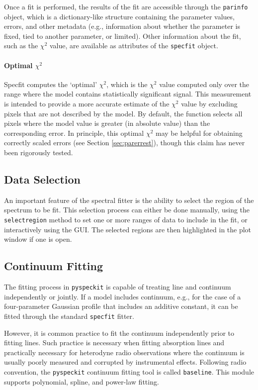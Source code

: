 \documentclass[twocolumn]{aastex62}
\newcommand{\pyspeckit}{\texttt{pyspeckit}\xspace}
\begin{document}
Once a fit is performed, the results of the fit are accessible through the
\texttt{parinfo} object, which is a dictionary-like structure containing
the parameter values, errors, and other metadata (e.g., information about
whether the parameter is fixed, tied to another parameter, or limited).
Other information about the fit, such as the $\chi^2$ value, are available
as attributes of the \texttt{specfit} object.

\paragraph{Optimal $\chi^2$}
Specfit computes the `optimal' $\chi^2$, which is the $\chi^2$
value computed only over the range where the model contains statistically
significant signal.  This measurement is intended to provide a more
accurate estimate of the $\chi^2$ value by excluding pixels that are
not described by the model.  By default, the function selects all pixels where
the model value is greater (in absolute value) than the corresponding error.
In principle, this optimal $\chi^2$ may be helpful for obtaining correctly
scaled errors (see Section \ref{sec:parerrest}), though this claim has never
been rigorously tested.

\subsection{Data Selection}
An important feature of the spectral fitter is the ability to select the region
of the spectrum to be fit.  This selection process can either be done manually,
using the \texttt{selectregion} method to set one or more ranges of data to
include in the fit, or interactively using the GUI.   The selected
regions are then highlighted in the plot window if one is open.

\subsection{Continuum Fitting}
The fitting process in \pyspeckit is capable of treating line and continuum
independently or jointly.  If a model includes continuum, e.g., for the case
of a four-parameter Gaussian profile that includes an additive constant, it
can be fitted through the standard \texttt{specfit} fitter.

However, it is common practice to fit the continuum independently prior to
fitting lines.  Such practice is necessary when fitting absorption lines
and practically necessary for heterodyne radio observations where the
continuum is usually poorly measured and corrupted by instrumental effects.
Following radio convention, the \pyspeckit continuum fitting tool is called
\texttt{baseline}. This module supports polynomial, spline, and power-law
fitting.
\end{document}

